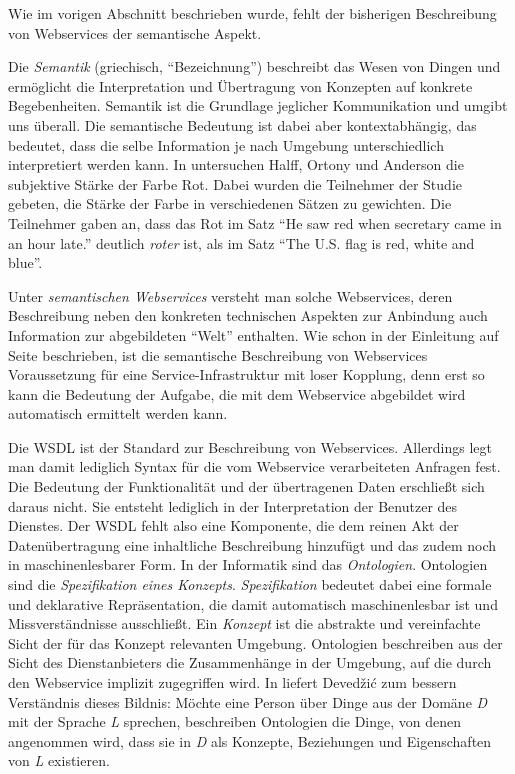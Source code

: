 Wie im vorigen Abschnitt beschrieben wurde, fehlt der bisherigen Beschreibung von Webservices der semantische Aspekt.

Die \emph{Semantik} (griechisch, "`Bezeichnung"') beschreibt das Wesen von Dingen und ermöglicht die Interpretation und Übertragung von Konzepten auf konkrete Begebenheiten. Semantik ist die Grundlage jeglicher Kommunikation und umgibt uns überall. Die semantische Bedeutung ist dabei aber kontextabhängig, das bedeutet, dass die selbe Information je nach Umgebung unterschiedlich interpretiert werden kann. In \cite[S.381]{springerlink:10.3758/BF03213193} untersuchen Halff, Ortony und Anderson die subjektive Stärke der Farbe Rot. Dabei wurden die Teilnehmer der Studie gebeten, die Stärke der Farbe in verschiedenen Sätzen zu gewichten. Die Teilnehmer gaben an, dass das Rot im Satz "`He saw red when secretary came in an hour late."' deutlich \emph{roter} ist, als im Satz "`The U.S. flag is red, white and blue"'.

Unter \emph{semantischen Webservices} versteht man solche Webservices, deren Beschreibung neben den konkreten technischen Aspekten zur Anbindung auch Information zur abgebildeten "`Welt"' enthalten. Wie schon in der Einleitung auf Seite \pageref{l:intro-loosecoupling} beschrieben, ist die semantische Beschreibung von Webservices Voraussetzung für eine Service-Infrastruktur mit loser Kopplung, denn erst so kann die Bedeutung der Aufgabe, die mit dem Webservice abgebildet wird automatisch ermittelt werden kann.

Die \ac{WSDL} ist der Standard zur Beschreibung von Webservices. Allerdings legt man damit lediglich Syntax für die vom Webservice verarbeiteten Anfragen fest. Die Bedeutung der Funktionalität und der übertragenen Daten erschließt sich daraus nicht. Sie entsteht lediglich in der Interpretation der Benutzer des Dienstes. Der \ac{WSDL} fehlt also eine Komponente, die dem reinen Akt der Datenübertragung eine inhaltliche Beschreibung hinzufügt und das zudem noch in maschinenlesbarer Form. In der Informatik sind das \emph{Ontologien}. Ontologien sind die \emph{Spezifikation eines Konzepts}. \emph{Spezifikation} bedeutet dabei eine formale und deklarative Repräsentation, die damit automatisch maschinenlesbar ist und Missverständnisse ausschließt. Ein \emph{Konzept} ist die abstrakte und vereinfachte Sicht der für das Konzept relevanten Umgebung. Ontologien beschreiben aus der Sicht des Dienstanbieters die Zusammenhänge in der Umgebung, auf die durch den Webservice implizit zugegriffen wird. In \cite[S.31]{dcswe} liefert Devedžić zum bessern Verständnis dieses Bildnis: Möchte eine Person über Dinge aus der Domäne \emph{D} mit der Sprache \emph{L} sprechen, beschreiben Ontologien die Dinge, von denen angenommen wird, dass sie in \emph{D} als Konzepte, Beziehungen und Eigenschaften von \emph{L} existieren.

